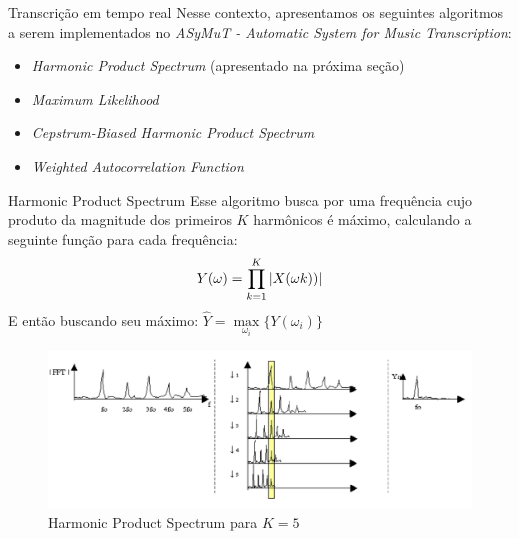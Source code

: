 \documentclass[final,hyperref={pdfpagelabels=false}]{beamer}
\begin{document}
\begin{frame}[t]
\begin{columns}[t]
\begin{column}{.465\textwidth}
\begin{block}{Transcrição em tempo real}
Nesse contexto, apresentamos os seguintes algoritmos a serem implementados no \emph{ASyMuT - Automatic System for Music Transcription}:

\begin{changemargin}{2cm}{2cm}
     \begin{itemize}
\item \emph{Harmonic Product Spectrum} (apresentado na próxima seção)
\item \emph{Maximum Likelihood}
\item \emph{Cepstrum-Biased Harmonic Product Spectrum}
\item \emph{Weighted Autocorrelation Function}
\end{itemize}
\end{changemargin}

\end{block}


\begin{block}{Harmonic Product Spectrum}
Esse algoritmo busca por uma frequência cujo produto da magnitude dos primeiros $K$ harmônicos é máximo, calculando a seguinte função para cada frequência: $$Y(\omega) = \prod _{k=1}^{K} \abs{X(\omega k))}$$
E então buscando seu máximo: $\widehat{Y} = \max\limits_{\omega_i}\{Y(\omega_i)\}$

     \begin{figure}%
\centering
\includegraphics[width=0.85\linewidth]{hps2.png}
\caption{Harmonic Product Spectrum para $K=5$}
\end{figure}

\end{block}



\end{column}
\end{columns}
\end{frame}
\end{document}
